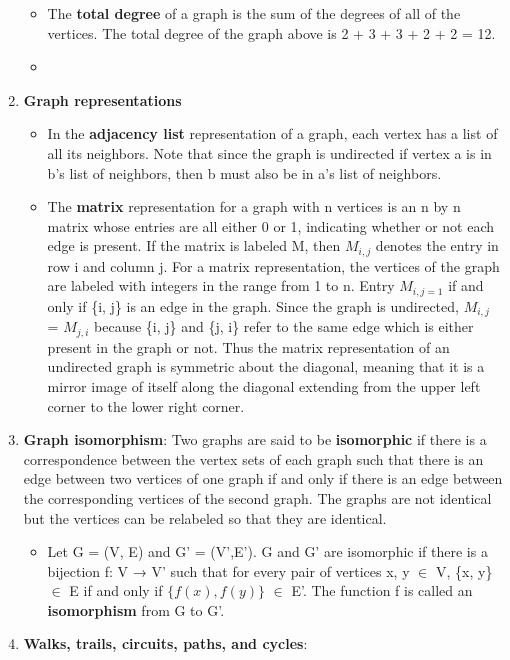 \documentclass[12pt,a4paper]{article}
\begin{document}
\begin{enumerate}
\begin{itemize}
    \item The \textbf{total degree} of a graph is the sum of the degrees of all of the vertices. The total degree of the graph above is 2 + 3 + 3 + 2 + 2 = 12.
    \item[] 
  \end{itemize}
  \item \textbf{Graph representations}
  \begin{itemize}
    \item In the \textbf{adjacency list} representation of a graph, each vertex has a list of all its neighbors. Note that since the graph is undirected if vertex a is in b's list of neighbors, then b must also be in a's list of neighbors.
    \item The \textbf{matrix} representation for a graph with n vertices is an n by n matrix whose entries are all either 0 or 1, indicating whether or not each edge is present. If the matrix is labeled M, then \(M_{i,j} \) denotes the entry in row i and column j. For a matrix representation, the vertices of the graph are labeled with integers in the range from 1 to n. Entry \(M_{i,j=1} \) if and only if \{i, j\} is an edge in the graph. Since the graph is undirected, \(M_{i,j} \) = \(M_{j,i} \) because \{i, j\} and \{j, i\} refer to the same edge which is either present in the graph or not. Thus the matrix representation of an undirected graph is symmetric about the diagonal, meaning that it is a mirror image of itself along the diagonal extending from the upper left corner to the lower right corner.
  \end{itemize}
  \item \textbf{Graph isomorphism}: Two graphs are said to be \textbf{isomorphic} if there is a correspondence between the vertex sets of each graph such that there is an edge between two vertices of one graph if and only if there is an edge between the corresponding vertices of the second graph. The graphs are not identical but the vertices can be relabeled so that they are identical.
  \begin{itemize}
    \item Let G = (V, E) and G' = (V',E').  G and G' are isomorphic if there is a bijection f: V → V' such that for every pair of vertices x, y \(\in \) V, \{x, y\} \(\in \) E if and only if \( \{f(x), f(y)\} \) \(\in \) E'. The function f is called an \textbf{isomorphism} from G to G'.
  \end{itemize}
  \item \textbf{Walks, trails, circuits, paths, and cycles}:

\end{enumerate}
\end{document}
